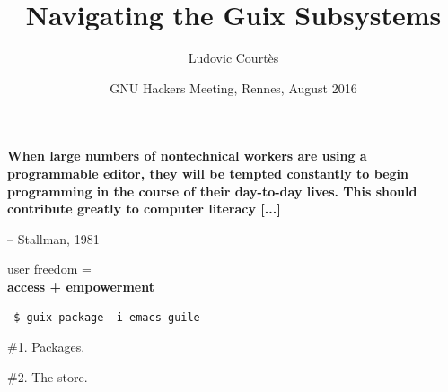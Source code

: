 \documentclass{beamer}
\title{Navigating the Guix Subsystems}
\author{Ludovic Courtès}
\date{\small{GNU Hackers Meeting, Rennes, August 2016}}
\begin{document}
\maketitle

\begin{frame}[plain]
\end{frame}

\begin{frame}[fragile]
  \textrm{\LARGE{\textbf{ When large numbers of nontechnical workers are
        using a programmable editor, they will be tempted constantly
        \alert{to begin programming} in the course of their day-to-day
        lives.  This should contribute greatly to computer literacy
        [...]
  }}}

  \vspace{1cm}
  \hfill{-- Stallman, 1981}
\end{frame}

\begin{frame}[plain]
  \Huge{user freedom =
    \\[0.8cm]
    \textbf{access + empowerment}}
\end{frame}

\begin{frame}[plain]
  \texttt{
    \Large{\$ guix package -i emacs guile}
  }
  \\[1cm]
\end{frame}

\begin{frame}[plain]
  \Huge{\#1. Packages.}
\end{frame}

\begin{frame}[plain]
  \Huge{\#2. The store.}
\end{frame}
\end{document}
